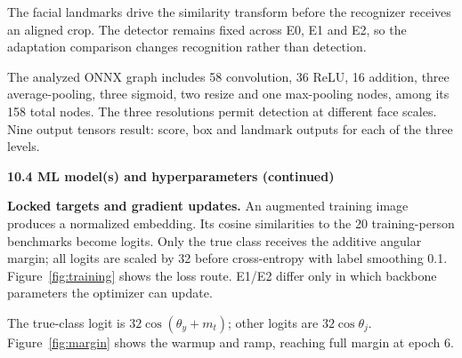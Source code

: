 \documentclass[11pt,a4paper]{article}
\newcommand{\cont}[1]{\par{\sffamily\bfseries #1}\par}
\newcommand{\nextpage}{\clearpage}
\begin{document}
The facial landmarks drive the similarity transform before the recognizer receives an aligned crop. The detector remains fixed across E0, E1 and E2, so the adaptation comparison changes recognition rather than detection.

The analyzed ONNX graph includes 58 convolution, 36 ReLU, 16 addition, three average-pooling, three sigmoid, two resize and one max-pooling nodes, among its 158 total nodes. The three resolutions permit detection at different face scales. Nine output tensors result: score, box and landmark outputs for each of the three levels.

\nextpage
\cont{10.4 ML model(s) and hyperparameters (continued)}
\textbf{Locked targets and gradient updates.} An augmented training image produces a normalized embedding. Its cosine similarities to the 20 training-person benchmarks become logits. Only the true class receives the additive angular margin; all logits are scaled by 32 before cross-entropy with label smoothing 0.1. Figure~\ref{fig:training} shows the loss route. E1/E2 differ only in which backbone parameters the optimizer can update.
\begin{center}
\label{fig:training}
\end{center}
The true-class logit is $32\cos(\theta_y+m_t)$; other logits are $32\cos\theta_j$. Figure~\ref{fig:margin} shows the warmup and ramp, reaching full margin at epoch 6.
\begin{center}
\label{fig:margin}
\end{center}
\end{document}
